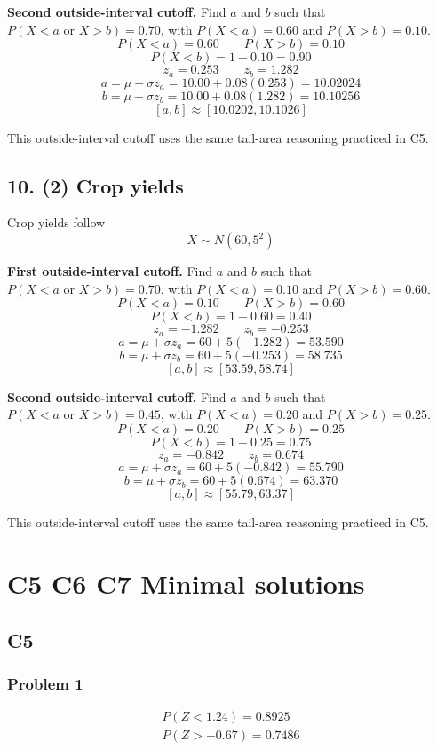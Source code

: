 	\textbf{Second outside-interval cutoff.} Find \(a\) and \(b\) such that \(P(X<a\text{ or }X>b)=0.70\), with \(P(X<a)=0.60\) and \(P(X>b)=0.10\).
	\[
	P(X<a)=0.60
	\qquad
	P(X>b)=0.10
	\]
	\[
	P(X<b)=1-0.10=0.90
	\]
	\[
	z_a=0.253
	\qquad
	z_b=1.282
	\]
	\[
	a=\mu+\sigma z_a
	=10.00+0.08(0.253)
	=10.02024
	\]
	\[
	b=\mu+\sigma z_b
	=10.00+0.08(1.282)
	=10.10256
	\]
	\[
	[a,b]\approx[10.0202,10.1026]
	\]
	
	This outside-interval cutoff uses the same tail-area reasoning practiced in C5.
	
	
	\subsection*{10. (2) Crop yields}
	\label{subsec:inverse-normal-problems-c7-10}
	Crop yields follow
	\[
	X\sim N(60,5^2)
	\]
	
	\textbf{First outside-interval cutoff.} Find \(a\) and \(b\) such that \(P(X<a\text{ or }X>b)=0.70\), with \(P(X<a)=0.10\) and \(P(X>b)=0.60\).
	\[
	P(X<a)=0.10
	\qquad
	P(X>b)=0.60
	\]
	\[
	P(X<b)=1-0.60=0.40
	\]
	\[
	z_a=-1.282
	\qquad
	z_b=-0.253
	\]
	\[
	a=\mu+\sigma z_a
	=60+5(-1.282)
	=53.590
	\]
	\[
	b=\mu+\sigma z_b
	=60+5(-0.253)
	=58.735
	\]
	\[
	[a,b]\approx[53.59,58.74]
	\]
	
	\textbf{Second outside-interval cutoff.} Find \(a\) and \(b\) such that \(P(X<a\text{ or }X>b)=0.45\), with \(P(X<a)=0.20\) and \(P(X>b)=0.25\).
	\[
	P(X<a)=0.20
	\qquad
	P(X>b)=0.25
	\]
	\[
	P(X<b)=1-0.25=0.75
	\]
	\[
	z_a=-0.842
	\qquad
	z_b=0.674
	\]
	\[
	a=\mu+\sigma z_a
	=60+5(-0.842)
	=55.790
	\]
	\[
	b=\mu+\sigma z_b
	=60+5(0.674)
	=63.370
	\]
	\[
	[a,b]\approx[55.79,63.37]
	\]
	
	This outside-interval cutoff uses the same tail-area reasoning practiced in C5.
	
	

\section{C5 C6 C7 Minimal solutions}

\subsection{C5}

\subsubsection{Problem 1}
\[
\begin{array}{l}
	P(Z<1.24)=0.8925\\
	P(Z>-0.67)=0.7486
\end{array}
\]

